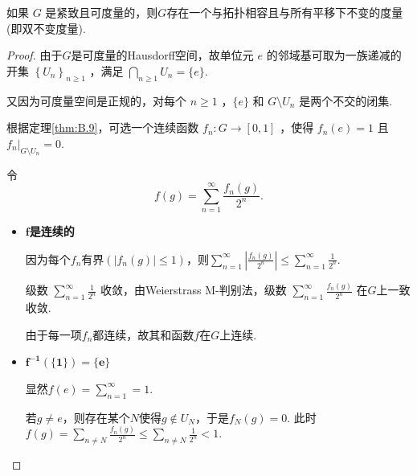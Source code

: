 \documentclass[lang=cn,a4paper,11pt,openany,scheme=chinese]{elegantbook}
\makeatletter
\renewcommand{\leq}{\leqslant}
\renewcommand{\geq}{\geqslant}
\newcommand\setboxcounter[2]{\setcounter{tcb@cnt@#1}{#2}}
\makeatother
\begin{document}
\setboxcounter{lemma}{1}
\begin{lemma}
    如果 \(G\) 是紧致且可度量的，则\(G\)存在一个与拓扑相容且与所有平移下不变的度量(即双不变度量).
\end{lemma}
\begin{proof}
    由于$G$是可度量的Hausdorff空间，故单位元 $e$ 的邻域基可取为一族递减的开集 \({\left\{  {U}_{n}\right\}  }_{n \geq  1}\) ，满足 \(\bigcap_{n \geq  1}{U}_{n} = \{ e\}\).\par
    又因为可度量空间是正规的，对每个 $n \geq  1$ ，$\{e\}$ 和 $G \setminus  {U}_{n}$ 是两个不交的闭集.\par
    根据定理\ref{thm:B.9}，可选一个连续函数 \({f}_{n} : G \rightarrow  \left\lbrack  {0,1}\right\rbrack\) ，使得 ${f}_{n}\left( e\right)  = 1$ 且 ${f}_{n}|_{G \setminus  {U}_{n}} = 0$. \par
    令
    \[
    f\left( g\right)  = \mathop{\sum }\limits_{{n = 1}}^{\infty }\frac{{f}_{n}\left( g\right)}{{2}^{n}}.
    \]
    \begin{itemize}
        \item \textbf{$\bm{f}$是连续的}\par
        因为每个$f_n$有界$\left(|f_n(g)|\leq 1\right)$，则$\sum_{n=1}^{\infty}{\left|\frac{f_n(g)}{2^n}\right|}\leq\sum_{n=1}^\infty{\frac{1}{2^n}}$.\par
        级数 $\sum_{n=1}^{\infty}{\frac{1}{2^n}}$ 收敛，由Weierstrass M-判别法，级数 $\sum_{{n = 1}}^{\infty }\frac{{f}_{n}\left( g\right)}{{2}^{n}}$ 在$G$上一致收敛.\par
        由于每一项$f_n$都连续，故其和函数$f$在$G$上连续.
        \item \textbf{$\bm{f^{-1}(\{1\})=\{e\}}$}\par
        显然$f(e)=\sum_{n=1}^\infty=1$.\par
        若$g\neq e$，则存在某个$N$使得$g\notin U_N$，于是$f_N(g)=0$. 此时$f(g)=\sum_{n\neq N}{\frac{f_n(g)}{2^n}}\leq \sum_{n\neq N}{\frac{1}{2^n}}<1$.
    \end{itemize}
    

\end{proof}
\end{document}
